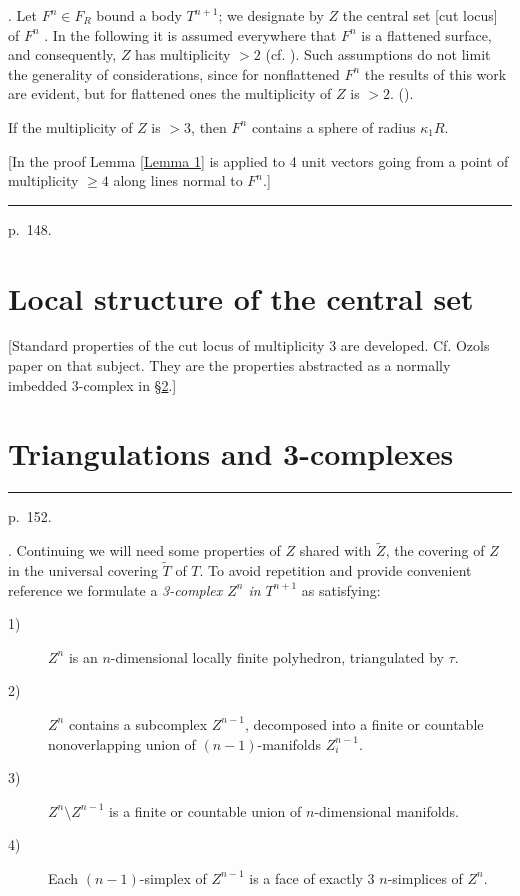 \documentclass{amsart}
\theoremstyle{plain}
\theoremstyle{definition}
\begin{document}
. Let $F^n \in F_R$ bound a body $T^{n+1}$; we designate by $Z$
the central set [cut locus] of $F^n$ \cite[p. 224]{LF}. In the
following it is assumed everywhere that $F^n$ is a flattened
surface, and consequently, $Z$ has multiplicity $>2$ (cf. \cite[pp. 206, 225]{L3}). Such assumptions do not limit the generality of
considerations, since for nonflattened $F^n$ the results of this
work are evident, but for flattened ones the multiplicity of
$Z$ is $>2$. (\cite[pp. 231-232]{L3}).
\begin{lem}\label{Lemma 2} If the multiplicity of $Z$ is $>3$, then
$F^n$ contains a sphere of radius $\kappa_1R$.
\end{lem}
[In the proof Lemma \ref{Lemma 1} is applied to 4 unit vectors going from a
point of multiplicity $\ge 4$ along lines normal to $F^n$.]

\medskip
\hrule\smallskip
\noindent p.~148.
\medskip

\section{Local structure of the central set}\label{sec:local}
[Standard properties of the cut locus of multiplicity 3 are
developed. Cf. Ozols paper on that subject. They are the properties
abstracted as a normally imbedded 3-complex in \S \ref{sec:triang}.]
\section{Triangulations and 3-complexes}\label{sec:triang}

\medskip
\hrule\smallskip
\noindent p.~152.
\medskip

. Continuing we will need some properties of $Z$ shared with
$\tilde Z$, the covering of $Z$ in the universal covering
$\tilde T$ of $T$. To avoid repetition and provide convenient
reference we formulate a {\em 3-complex $Z^n$ in} $T^{n+1}$ as
satisfying:
\begin{description}
\item[1)] $Z^n$ is an $n$-dimensional locally finite polyhedron,
triangulated by $\tau$.
\item[2)] $Z^n$ contains a subcomplex $Z^{n-1}$, decomposed
into a finite or countable nonoverlapping union of
$(n-1)$-manifolds $Z^{n-1}_i$.
\item[3)] $Z^n\setminus Z^{n-1}$ is a finite or countable
union of $n$-dimensional manifolds.
\item[4)] Each $(n-1)$-simplex of $Z^{n-1}$ is a face of
exactly 3 $n$-simplices of $Z^n$.
\end{description}
\end{document}
